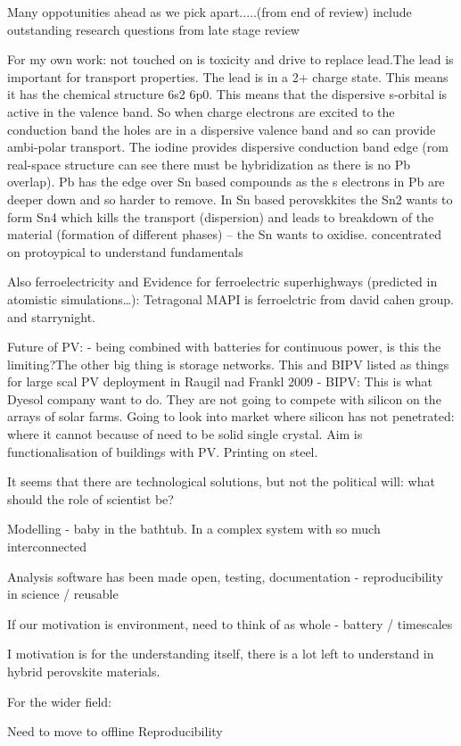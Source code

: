 

Many oppotunities ahead as we pick apart.....(from end of review)
include outstanding research questions from late stage review

For my own work:
not touched on is toxicity and drive to replace lead.The lead is important for transport properties. The lead is in a 2+ charge state. This means it has the chemical structure 6s2 6p0. This means that the dispersive s-orbital is active in the valence band. So when charge electrons are excited to the conduction band the holes are in a dispersive valence band and so can provide ambi-polar transport. The iodine provides dispersive conduction band edge (rom real-space structure can see there must be hybridization as there is no Pb overlap). Pb has the edge over Sn based compounds as the s electrons in Pb are deeper down and so harder to remove. In Sn based perovskkites the Sn2 wants to form Sn4 which kills the transport (dispersion) and leads to breakdown of the material (formation of different phases) – the Sn wants to oxidise.
 concentrated on protoypical to understand fundamentals
 
 Also ferroelectricity and Evidence for ferroelectric superhighways (predicted in atomistic simulations…): Tetragonal MAPI is ferroelctric from david cahen group. and starrynight.
 
 Future of PV:
 - being combined with batteries for continuous power, is this the limiting?The other big thing is storage networks. This and BIPV listed as things for large scal PV deployment in Raugil nad Frankl 2009
- BIPV: This is what Dyesol company want to do. They are not going to compete with silicon on the arrays of solar farms. Going to look into market where silicon has not penetrated: where it cannot because of need to be solid single crystal. Aim is functionalisation of buildings with PV. Printing on steel.
 
 It seems that there are technological solutions, but not the political will: what should the role of scientist be?
 
 Modelling - baby in the bathtub. In a complex system with so much interconnected
 
 Analysis software has been made open, testing, documentation - reproducibility in science / reusable
 
 If our motivation is environment, need to think of as whole - battery / timescales
 
 I motivation is for the understanding itself, there is a lot left to understand in hybrid perovskite materials.

For the wider field:

Need to move to offline
Reproducibility
